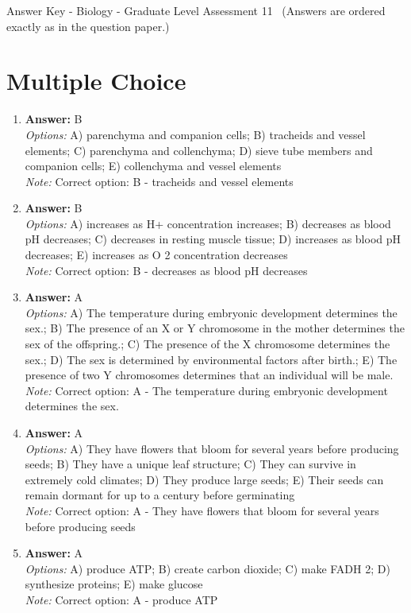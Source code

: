 \documentclass[12pt]{article}
\begin{document}
\begin{center}
Answer Key - Biology - Graduate Level Assessment 11 \
\small (Answers are ordered exactly as in the question paper.)
\end{center}

\section*{Multiple Choice}
\begin{enumerate}[label=\arabic*.]
\item \textbf{Answer:} B
\\ \textit{Options:} A) parenchyma and companion cells; B) tracheids and vessel elements; C) parenchyma and collenchyma; D) sieve tube members and companion cells; E) collenchyma and vessel elements
\\ \textit{Note:} Correct option: B - tracheids and vessel elements
\item \textbf{Answer:} B
\\ \textit{Options:} A) increases as H+ concentration increases; B) decreases as blood pH decreases; C) decreases in resting muscle tissue; D) increases as blood pH decreases; E) increases as O 2 concentration decreases
\\ \textit{Note:} Correct option: B - decreases as blood pH decreases
\item \textbf{Answer:} A
\\ \textit{Options:} A) The temperature during embryonic development determines the sex.; B) The presence of an X or Y chromosome in the mother determines the sex of the offspring.; C) The presence of the X chromosome determines the sex.; D) The sex is determined by environmental factors after birth.; E) The presence of two Y chromosomes determines that an individual will be male.
\\ \textit{Note:} Correct option: A - The temperature during embryonic development determines the sex.
\item \textbf{Answer:} A
\\ \textit{Options:} A) They have flowers that bloom for several years before producing seeds; B) They have a unique leaf structure; C) They can survive in extremely cold climates; D) They produce large seeds; E) Their seeds can remain dormant for up to a century before germinating
\\ \textit{Note:} Correct option: A - They have flowers that bloom for several years before producing seeds
\item \textbf{Answer:} A
\\ \textit{Options:} A) produce ATP; B) create carbon dioxide; C) make FADH 2; D) synthesize proteins; E) make glucose
\\ \textit{Note:} Correct option: A - produce ATP
\end{enumerate}
\end{document}
